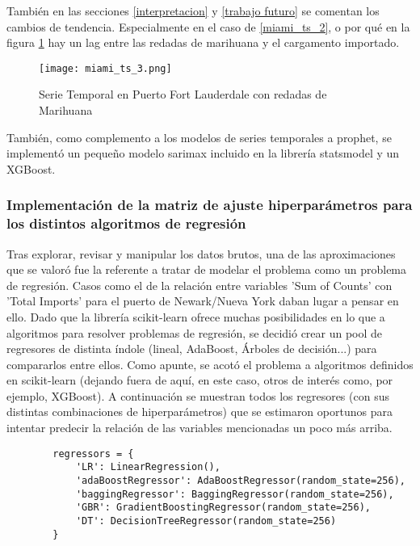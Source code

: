 \documentclass[12pt]{article}
\begin{document}
	También en las secciones \ref{interpretacion} y \ref{trabajo futuro} se comentan los cambios de tendencia. Especialmente en el caso de \ref{miami_ts_2}, o por qué en la figura \ref{miami_ts_3} hay un lag entre las redadas de marihuana y el cargamento importado.
	
	\begin{figure}[H]
		\caption{\label{miami_ts_3} Serie Temporal en Puerto Fort Lauderdale con redadas de Marihuana}
		\centering
		\hspace*{1cm}
		\texttt{[image: miami\_ts\_3.png]}
	\end{figure}
	
	También, como complemento a los modelos de series temporales a prophet, se implementó un pequeño modelo sarimax incluido en la librería statsmodel y un XGBoost.
	
	\subsubsection{\label{hiperCV}Implementación de la matriz de ajuste hiperparámetros para los distintos algoritmos de regresión}
	Tras explorar, revisar y manipular los datos brutos, una de las aproximaciones que se valoró fue la referente a tratar de modelar el problema como un problema de regresión. Casos como el de la relación entre variables 'Sum of Counts' con 'Total Imports' para el puerto de Newark/Nueva York daban lugar a pensar en ello. Dado que la librería scikit-learn ofrece muchas posibilidades en lo que a algoritmos para resolver problemas de regresión, se decidió crear un pool de regresores de distinta índole (lineal, AdaBoost, Árboles de decisión...) para compararlos entre ellos. Como apunte, se acotó el problema a algoritmos definidos en scikit-learn (dejando fuera de aquí, en este caso, otros de interés como, por ejemplo, XGBoost). A continuación se muestran todos los regresores (con sus distintas combinaciones de hiperparámetros) que se estimaron oportunos para intentar predecir la relación de las variables mencionadas un poco más arriba.
	
	\begin{verbatim}
		regressors = {
			'LR': LinearRegression(),
			'adaBoostRegressor': AdaBoostRegressor(random_state=256),
			'baggingRegressor': BaggingRegressor(random_state=256),
			'GBR': GradientBoostingRegressor(random_state=256),
			'DT': DecisionTreeRegressor(random_state=256)
		}
	\end{verbatim}
\end{document}
